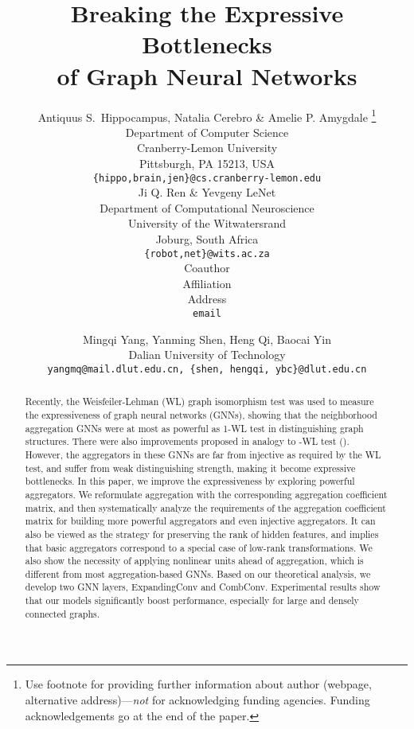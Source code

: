 \documentclass{article} \usepackage{iclr2021_conference,times}
\title{Breaking the Expressive Bottlenecks \\ of Graph Neural Networks}
\author{Antiquus S.~Hippocampus, Natalia Cerebro \& Amelie P. Amygdale \thanks{ Use footnote for providing further information
about author (webpage, alternative address)---\emph{not} for acknowledging
funding agencies.  Funding acknowledgements go at the end of the paper.} \\
Department of Computer Science\\
Cranberry-Lemon University\\
Pittsburgh, PA 15213, USA \\
\texttt{\{hippo,brain,jen\}@cs.cranberry-lemon.edu} \\
\And
Ji Q. Ren \& Yevgeny LeNet \\
Department of Computational Neuroscience \\
University of the Witwatersrand \\
Joburg, South Africa \\
\texttt{\{robot,net\}@wits.ac.za} \\
\AND
Coauthor \\
Affiliation \\
Address \\
\texttt{email}
}
\author{Mingqi Yang, Yanming Shen, Heng Qi, Baocai Yin \\
Dalian University of Technology \\
\texttt{yangmq@mail.dlut.edu.cn, \{shen, hengqi, ybc\}@dlut.edu.cn}\\
}
\begin{document}
\maketitle

\begin{abstract}
Recently, the Weisfeiler-Lehman (WL) graph isomorphism test was used to measure the expressiveness of graph neural networks (GNNs), showing that the neighborhood aggregation GNNs were at most as powerful as 1-WL test in distinguishing graph structures. There were also improvements proposed in analogy to -WL test (). However, the aggregators in these GNNs are far from injective as required by the WL test, and suffer from weak distinguishing strength, making it become expressive bottlenecks. In this paper, we improve the expressiveness by exploring powerful aggregators. We reformulate aggregation with the corresponding aggregation coefficient matrix, and then systematically analyze the requirements of the aggregation coefficient matrix for building more powerful aggregators and even injective aggregators. It can also be viewed as the strategy for preserving the rank of hidden features, and implies that basic aggregators correspond to a special case of low-rank transformations. We also show the necessity of applying nonlinear units ahead of aggregation, which is different from most aggregation-based GNNs. Based on our theoretical analysis, we develop two GNN layers, ExpandingConv and CombConv. Experimental results show that our models significantly boost performance, especially for large and densely connected graphs.
\end{abstract}

\iffalse
Recently, the Weisfeiler-Lehman (WL) graph isomorphism test was used to measure the expressiveness of graph neural networks (GNNs), showing that the neighborhood aggregation GNNs were at most as powerful as 1-WL test in distinguishing graph structures. There were also improvements proposed in analogy to -WL test (). However, the aggregators in these GNNs are far from injective as required by the WL test, and suffer from weak distinguishing strength, making it become expressive bottlenecks. In this paper, we improve the expressiveness by exploring powerful aggregators. We reformulate aggregation with the corresponding aggregation coefficient matrix, and then systematically analyze the requirements of the aggregation coefficient matrix for building more powerful aggregators and even injective aggregators. It can also be viewed as the strategy for preserving the rank of hidden features, and implies that basic aggregators correspond to a special case of low-rank transformations. We also show the necessity of applying nonlinear units ahead of aggregation, which is different from most aggregation-based GNNs. Based on our theoretical analysis, we develop two GNN layers, ExpandingConv and CombConv. Experimental results show that our models significantly boost performance, especially for large and densely connected graphs.
\fi
\end{document}
